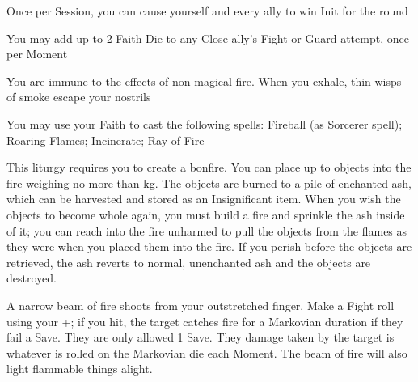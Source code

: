 {

Once per Session, you can cause yourself and every ally to win Init for the round


You may add up to 2 Faith Die to any Close ally's Fight \RO or Guard \RO attempt, once per Moment






\GOD[
Name=Xotli,
Link=small-god-xotli,
GodOf=Fiendish Prince of Fire,
Holy=A red stone (agate; garnet; carnelian; red cinnabar; etc) worn on a choker.
]


You are immune to the effects of non-magical fire. When you exhale, thin wisps of smoke escape your nostrils


You may use your Faith to cast the following spells: Fireball (as Sorcerer spell); Roaring Flames; Incinerate; Ray of Fire

\LITURGY [
  Name= Incinerate,
  Link= xotli-liturgy-incinerate,
  Paradigm= Elements ,
  Save=  N ,
  Duration= See spell ,
  Counter=  n/a  ,
  Keywords= None ,
  Target=   Close objects
]



This liturgy requires you to create a bonfire.  You can place up to \DICE objects into the fire weighing no more than \SUMDICE kg.  The objects are burned to a pile of enchanted ash, which can be harvested and stored as an Insignificant item.  When you wish the objects to become whole again, you must build a fire and sprinkle the ash inside of it; you can reach into the fire unharmed to pull the objects from the flames as they were when you placed them into the fire.  If you perish before the objects are retrieved, the ash reverts to normal, unenchanted ash and the objects are destroyed.

\LITURGY [
  Name= Ray of Fire,
  Link=xotli-liturgy-ray of fire,
  Paradigm= Elements ,
  Save=  Y (negates) ,
  Duration= 0 ,
  Counter=  n/a  ,
  Keywords= None ,
  Target=   Nearby or Far-Away target
]



A narrow beam of fire shoots from your outstretched finger.  Make a Fight roll using your \FOC+\DICE; if you hit, the target catches fire for a Markovian duration if they fail a Save.  They are only allowed 1 Save.  They damage taken by the target is whatever is rolled on the Markovian die each Moment.  The beam of fire will also light flammable things alight.

}
